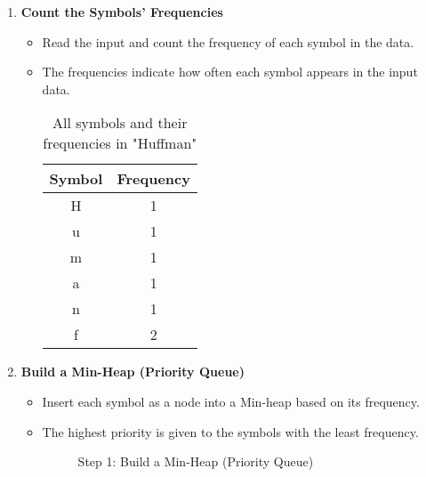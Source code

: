 \begin{enumerate}[label=\textbf{\Alph*.}]  
    \item \textbf{Count the Symbols' Frequencies}  
    \begin{itemize}  
        \item Read the input and count the frequency of each symbol in the data.  
        \item The frequencies indicate how often each symbol appears in the input data.  
        \begin{table}[h!]  
        \centering  
        \begin{tabular}{|c|c|}  
        \hline  
        \rowcolor{gray!30}  
        Symbol & Frequency \\
        \hline  
        H & 1 \\
        u & 1 \\
        m & 1 \\
        a & 1 \\
        n & 1 \\
        f & 2 \\
        \hline  
        \end{tabular}  
        \caption{All symbols and their frequencies in "Huffman"}  
        \end{table}  
    \end{itemize}  

    \item \textbf{Build a Min-Heap (Priority Queue)}  
    \begin{itemize}  
        \item Insert each symbol as a node into a Min-heap based on its frequency.  
        \item The highest priority is given to the symbols with the least frequency.  

        \begin{figure}[H]  
        \centering  
        \caption{Step 1: Build a Min-Heap (Priority Queue)}  
        \end{figure}  
    \end{itemize}  


\end{enumerate}
